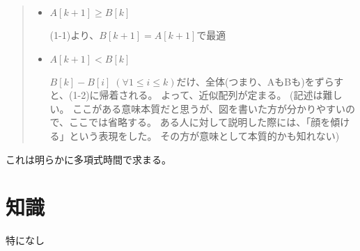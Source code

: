 \documentclass[a4paper, 10pt, dvipdfmx]{jlreq}
\begin{document}
\begin{quote}
    \begin{itemize}
        \item  $A[k+1] \geq B[k]$

              (1-1)より、$B[k+1]=A[k+1]$で最適

        \item  $A[k+1] < B[k]$

              $B[k]-B[i] \; (\forall 1 \leq i \leq k)$だけ、全体(つまり、AもBも)をずらすと、(1-2)に帰着される。
              よって、近似配列が定まる。
              (記述は難しい。
              ここがある意味本質だと思うが、図を書いた方が分かりやすいので、ここでは省略する。
              ある人に対して説明した際には、「顔を傾ける」という表現をした。
              その方が意味として本質的かも知れない)
    \end{itemize}
\end{quote}

これは明らかに多項式時間で求まる。

\section{知識}

特になし
\end{document}
